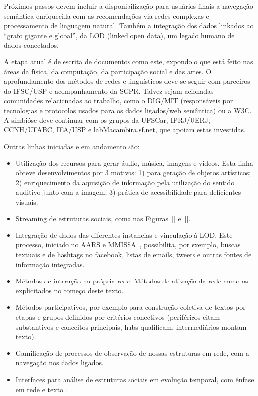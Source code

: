 \documentclass[a4paper, 11pt]{article} %
\begin{document}
Próximos passos devem incluir a disponibilização para usuários finais a navegação semântica enriquecida com as recomendações via redes complexas e processamento de linguagem natural. Também a integração dos dados linkados ao ``grafo gigante e global'', da LOD (linked open data), um legado humano de dados conectados.

A etapa atual é de escrita de documentos como este, expondo o que está feito nas áreas da física, da computação, da participação social e das artes. O aprofundamento dos métodos de redes e linguísticos deve se seguir com parceiros do IFSC/USP e acompanhamento da SGPR. Talvez sejam acionadas comunidades relacionadas ao trabalho, como o DIG/MIT (responsáveis por tecnologias e protocolos usados para os dados ligados/web semântica) ou a W3C. A simbióse deve continuar com os grupos da UFSCar, IPRJ/UERJ, CCNH/UFABC, IEA/USP e labMacambira.sf.net, que apoiam estas investidas.

Outras linhas iniciadas e em andamento são:
\begin{itemize}
\item Utilização dos recursos para gerar áudio, música, imagens e videos. Esta linha obteve desenvolvimentos por 3 motivos: 1) para geração de objetos artísticos; 2) enriquecimento da aquisição de informação pela utilização do sentido auditivo junto com a imagem; 3) prática de acessibilidade para deficientes visuais.
\item Streaming de estruturas sociais, como nas Figuras~\ref{} e~\ref{}.
\item Integração de dados das diferentes instancias e vinculação à LOD. Este processo, iniciado no AARS e MMISSA~\cite{aars,mmissa}, possibilita, por exemplo, buscas textuais e de hashtags no facebook, listas de emails, tweets e outras fontes de informação integradas.
\item Métodos de interação na própria rede. Métodos de ativação da rede como os explicitados no começo deste texto.
\item Métodos participativos, por exemplo para construção coletiva de textos por etapas e grupos definidos por critérios conectivos (periféricos citam substantivos e conceitos principais, hubs qualificam, intermediários montam texto).
\item Gamificação de processos de observação de nossas estruturas em rede, com a navegação nos dados ligados.
\item Interfaces para análise de estruturas sociais em evolução temporal, com ênfase em rede e texto .
\end{itemize}
\end{document}

